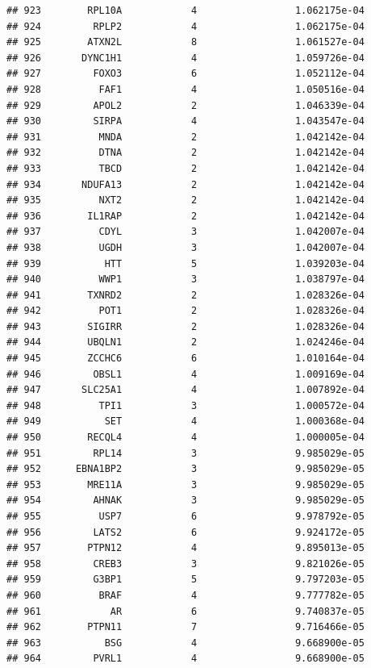 \documentclass[
]{article}
\begin{document}
\begin{verbatim}
## 923        RPL10A            4                 1.062175e-04
## 924         RPLP2            4                 1.062175e-04
## 925        ATXN2L            8                 1.061527e-04
## 926       DYNC1H1            4                 1.059726e-04
## 927         FOXO3            6                 1.052112e-04
## 928          FAF1            4                 1.050516e-04
## 929         APOL2            2                 1.046339e-04
## 930         SIRPA            4                 1.043547e-04
## 931          MNDA            2                 1.042142e-04
## 932          DTNA            2                 1.042142e-04
## 933          TBCD            2                 1.042142e-04
## 934       NDUFA13            2                 1.042142e-04
## 935          NXT2            2                 1.042142e-04
## 936        IL1RAP            2                 1.042142e-04
## 937          CDYL            3                 1.042007e-04
## 938          UGDH            3                 1.042007e-04
## 939           HTT            5                 1.039203e-04
## 940          WWP1            3                 1.038797e-04
## 941        TXNRD2            2                 1.028326e-04
## 942          POT1            2                 1.028326e-04
## 943        SIGIRR            2                 1.028326e-04
## 944        UBQLN1            2                 1.024246e-04
## 945        ZCCHC6            6                 1.010164e-04
## 946         OBSL1            4                 1.009169e-04
## 947       SLC25A1            4                 1.007892e-04
## 948          TPI1            3                 1.000572e-04
## 949           SET            4                 1.000368e-04
## 950        RECQL4            4                 1.000005e-04
## 951         RPL14            3                 9.985029e-05
## 952      EBNA1BP2            3                 9.985029e-05
## 953        MRE11A            3                 9.985029e-05
## 954         AHNAK            3                 9.985029e-05
## 955          USP7            6                 9.978792e-05
## 956         LATS2            6                 9.924172e-05
## 957        PTPN12            4                 9.895013e-05
## 958         CREB3            3                 9.821026e-05
## 959         G3BP1            5                 9.797203e-05
## 960          BRAF            4                 9.777782e-05
## 961            AR            6                 9.740837e-05
## 962        PTPN11            7                 9.716466e-05
## 963           BSG            4                 9.668900e-05
## 964         PVRL1            4                 9.668900e-05

\end{verbatim}
\end{document}
